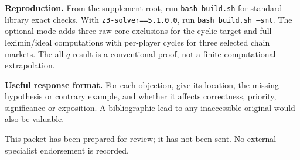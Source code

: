\documentclass[11pt]{article}
\begin{document}
\textbf{Reproduction.} From the supplement root, run
\texttt{bash build.sh} for standard-library exact checks.
With \texttt{z3-solver==5.1.0.0}, run
\texttt{bash build.sh --smt}. The optional mode adds three raw-core
exclusions for the cyclic target and full-leximin/ideal computations
with per-player cycles for three selected chain markets. The all-$q$
result is a conventional proof, not a finite computational extrapolation.

\textbf{Useful response format.} For each objection, give its location,
the missing hypothesis or contrary example, and whether it affects
correctness, priority, significance or exposition. A bibliographic lead
to any inaccessible original would also be valuable.

\vfill
\small This packet has been prepared for review; it has not been sent.
No external specialist endorsement is recorded.
\end{document}
